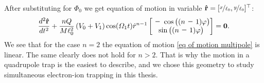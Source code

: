 After substituting for $\Phi_0$ we get equation of motion in variable $\vb{\hat{r}} = [\nicefrac{x}{\ell_0},\nicefrac{y}{\ell_0}]^\top$:
\begin{equation}
	\label{eq of motion multipole}
	\dfrac{d^2\vb{\hat{r}}}{dt^2} + \dfrac{n Q}{M \ell_0^2}\left(V_0 + V_1\right)\cos(\Omega_1 t) \hat{r}^{n-1}
	\begin{bmatrix}
		\minus\cos\big((n \minus 1)\varphi\big) \\
		\sin\big((n \minus 1)\varphi\big)
	\end{bmatrix} = \vb{0}.
\end{equation}
We see that for the case $n = 2$ the equation of motion \eqref{eq of motion multipole} is linear. The same clearly does not hold for $n > 2$. That is why the motion in a quadrupole trap is the easiest to describe, and we chose this geometry to study simultaneous electron-ion trapping in this thesis.

